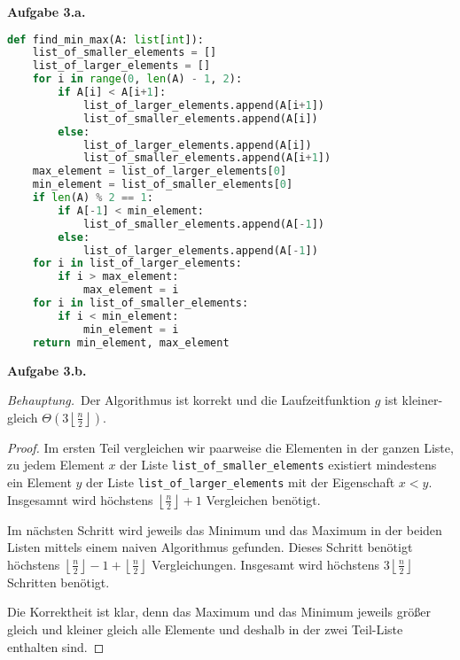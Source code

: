 \documentclass[12pt]{extarticle}
\newcommand{\aufgn}[1]{\textbf{Aufgabe #1.}}
\newcommand{\beh}{\textit{Behauptung.}\ }
\begin{document}
\newpage
\aufgn{3.a}
\begin{lstlisting}[language=Python]
def find_min_max(A: list[int]):
    list_of_smaller_elements = []
    list_of_larger_elements = []
    for i in range(0, len(A) - 1, 2):
        if A[i] < A[i+1]:
            list_of_larger_elements.append(A[i+1])
            list_of_smaller_elements.append(A[i])
        else:
            list_of_larger_elements.append(A[i])
            list_of_smaller_elements.append(A[i+1])
    max_element = list_of_larger_elements[0]
    min_element = list_of_smaller_elements[0]
    if len(A) % 2 == 1:
        if A[-1] < min_element:
            list_of_smaller_elements.append(A[-1])
        else:
            list_of_larger_elements.append(A[-1])
    for i in list_of_larger_elements:
        if i > max_element:
            max_element = i
    for i in list_of_smaller_elements:
        if i < min_element:
            min_element = i
    return min_element, max_element
\end{lstlisting}
\aufgn{3.b}

\beh Der Algorithmus ist korrekt und die
Laufzeitfunktion \(g\) ist kleiner-gleich
$\Theta\left(3 \left \lfloor \frac{n}{2} \right \rfloor
\right)$.

\begin{proof}
  Im ersten Teil vergleichen wir paarweise die Elementen
  in der ganzen Liste, zu jedem Element \(x\) der Liste
  \texttt{list\_of\_smaller\_elements} existiert mindestens
  ein Element \(y\) der Liste
  \texttt{list\_of\_larger\_elements} mit der Eigenschaft
  \(x < y\).  Insgesamnt wird höchstens
  \(\left \lfloor \frac{n}{2} \right \rfloor + 1\)
  Vergleichen benötigt.

  Im nächsten Schritt wird jeweils das Minimum und das
  Maximum in der beiden Listen mittels einem naiven
  Algorithmus gefunden.  Dieses Schritt benötigt
  höchstens
  $\left \lfloor \frac{n}{2} \right \rfloor - 1 + \left
    \lfloor \frac{n}{2} \right \rfloor$ Vergleichungen.
  Insgesamt wird höchstens
  \(3 \left \lfloor \frac{n}{2} \right \rfloor\) Schritten
  benötigt.

  Die Korrektheit ist klar, denn das Maximum und das
  Minimum jeweils größer gleich und kleiner gleich alle
  Elemente und deshalb in der zwei Teil-Liste enthalten sind.
\end{proof}
\end{document}
